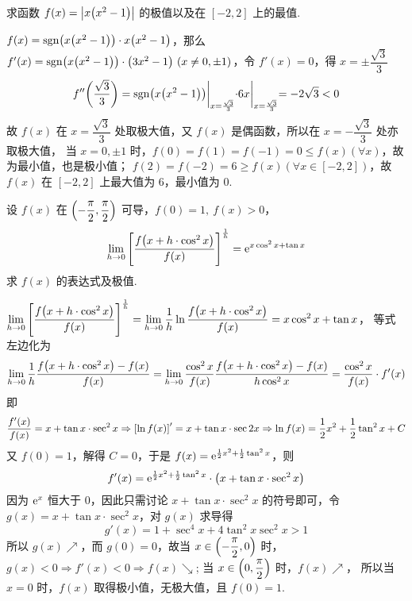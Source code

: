 \begin{example}
    求函数 $f(x)=\qty|x\qty(x^2-1)|$ 的极值以及在 $[-2,2]$ 上的最值.
\end{example}
\begin{solution}
    $f(x)=\mathrm{sgn}\qty(x\qty(x^2-1))\cdot x\qty(x^2-1)$，那么 $f'(x)=\mathrm{sgn}\qty(x\qty(x^2-1))\cdot\qty(3x^2-1)~ (x\neq0,\pm1)$，令 $f'(x)=0$，得
    $x=\pm\dfrac{\sqrt{3}}{3}$
    $$f''\qty(\dfrac{\sqrt{3}}{3})=\mathrm{sgn}\qty(x\qty(x^2-1))\biggl |_{x=\frac{\sqrt{3}}{3}}\cdot 6x\biggl |_{x=\frac{\sqrt{3}}{3}}=-2\sqrt{3}<0$$
    故 $f(x)$ 在 $x=\dfrac{\sqrt{3}}{3}$ 处取极大值，又 $f(x)$ 是偶函数，所以在 $x=-\dfrac{\sqrt{3}}{3}$ 处亦取极大值，
    当 $x=0,\pm1$ 时，$f(0)=f(1)=f(-1)=0\leqslant f(x)(\forall x)$，故为最小值，也是极小值；
    $f(2)=f(-2)=6\geqslant f(x)(\forall x\in[-2,2])$，故 $f(x)$ 在 $[-2,2]$ 上最大值为 6，最小值为 0.
\end{solution}

\begin{example}
    设 $f(x)$ 在 $\qty(-\dfrac{\pi}{2},\dfrac{\pi}{2})$ 可导，$f(0)=1,~f(x)>0$，$$\displaystyle\lim_{h\to0}\qty[\dfrac{f\qty(x+h\cdot \cos^2x)}{f(x)}]^{\frac{1}{h}}=\mathrm{e}^{x\cos^2x+\tan x}$$
    求 $f(x)$ 的表达式及极值.
\end{example}
\begin{solution}
    $\displaystyle\lim_{h\to0}\qty[\dfrac{f\qty(x+h\cdot \cos^2x)}{f(x)}]^{\frac{1}{h}}=\lim_{h\to0}\dfrac{1}{h}\ln\dfrac{f\qty(x+h\cdot\cos^2x)}{f(x)}=x\cos^2x+\tan x$，
    等式左边化为 $$\lim_{h\to0}\dfrac{1}{h}\dfrac{f\qty(x+h\cdot\cos^2x)-f(x)}{f(x)}=\lim_{h\to0}\dfrac{\cos^2x}{f(x)}\dfrac{f\qty(x+h\cdot\cos^2x)-f(x)}{h\cos^2x}=\dfrac{\cos^2x}{f(x)}\cdot f'(x)$$
    即 $$\dfrac{f'(x)}{f(x)}=x+\tan x\cdot\sec^2x\Rightarrow \qty[\ln f(x)]'=x+\tan x\cdot\sec2x\Rightarrow \ln f(x)=\dfrac{1}{2}x^2+\dfrac{1}{2}\tan^2x+C$$
    又 $f(0)=1$，解得 $C=0$，于是
    $f(x)=\mathrm{e}^{\frac{1}{2}x^2+\frac{1}{2}\tan^2x}$，则
    $$f'(x)=\mathrm{e}^{\frac{1}{2}x^2+\frac{1}{2}\tan^2x}\cdot\qty(x+\tan x\cdot\sec^2x)$$
    因为 $\mathrm{e}^{x}$ 恒大于 0，因此只需讨论 $x+\tan x\cdot\sec^2x$ 的符号即可，令 $g(x)=x+\tan x\cdot\sec^2x$，对 $g(x)$ 求导得 $$g'(x)=1+\sec^4x+4\tan^2x\sec^2x>1$$
    所以 $g(x)\nearrow$，而 $g(0)=0$，故当 $x\in\qty(-\dfrac{\pi}{2},0)$ 时，$g(x)<0\Rightarrow f'(x)<0\Rightarrow f(x)\searrow$; 当 $x\in\qty(0,\dfrac{\pi}{2})$ 时，$f(x)\nearrow$，
    所以当 $x=0$ 时，$f(x)$ 取得极小值，无极大值，且 $f(0)=1.$
\end{solution}

